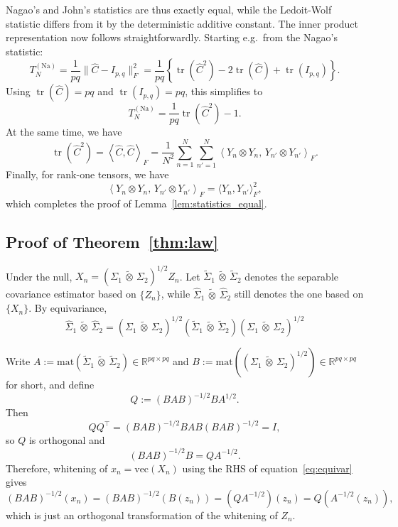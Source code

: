 \documentclass[12pt]{article}
\newcommand{\R}{\mathbb{R}}
\renewcommand{\vec}{\mathrm{vec}}
\newcommand{\mat}{\mathrm{mat}}
\newcommand{\ot}{\,\tilde\otimes\,}
\begin{document}
Nagao's and John's statistics are thus exactly equal, while the Ledoit-Wolf statistic differs from it by the deterministic additive constant. The inner product representation now follows straightforwardly. Starting e.g.~from the Nagao's statistic:
\[
T_N^{(\mathrm{Na})}
=
\frac{1}{pq}\|\widehat C-I_{p,q}\|_F^2
=
\frac{1}{pq}
\left\{
\operatorname{tr}(\widehat C^2)
-2\operatorname{tr}(\widehat C)
+\operatorname{tr}(I_{p,q})
\right\}.
\]
Using \(\operatorname{tr}(\widehat C)=pq\) and
\(\operatorname{tr}(I_{p,q})=pq\), this simplifies to
\[
T_N^{(\mathrm{Na})}
=
\frac{1}{pq}\operatorname{tr}(\widehat C^2)-1.
\]
At the same time, we have
\[
\operatorname{tr}(\widehat C^2)
=
\left\langle \widehat C,\widehat C \right\rangle_F
=
\frac{1}{N^2}
\sum_{n=1}^N
\sum_{n'=1}^N
\left\langle
Y_n\otimes Y_n,\,
Y_{n'}\otimes Y_{n'}
\right\rangle_F .
\]
Finally, for rank-one tensors, we have
\[
\left\langle
Y_n\otimes Y_n,\,
Y_{n'}\otimes Y_{n'}
\right\rangle_F
=
\langle Y_n,Y_{n'}\rangle_F^2,
\]
which completes the proof of Lemma~\ref{lem:statistics_equal}.

\subsection{Proof of Theorem~\ref{thm:law}}

Under the null, $X_n = (\Sigma_1\ot\Sigma_2)^{1/2} Z_n$. Let $\widetilde\Sigma_1\ot\widetilde\Sigma_2$ denotes the separable covariance estimator based on $\{Z_n\}$, while $\widehat\Sigma_1\ot\widehat\Sigma_2$ still denotes the one based on $\{X_n\}$. By equivariance,
\begin{equation}\label{eq:equivar}
    \widehat\Sigma_1\ot\widehat\Sigma_2 = (\Sigma_1\ot\Sigma_2)^{1/2} ( \widetilde\Sigma_1\ot\widetilde\Sigma_2)  (\Sigma_1\ot\Sigma_2)^{1/2} 
\end{equation}

Write $A:=\mat(\widetilde\Sigma_1\ot\widetilde\Sigma_2) \in \R^{pq \times pq}$ and $B := \mat((\Sigma_1\ot\Sigma_2)^{1/2})\in \R^{pq \times pq}$ for short, and define
\[
Q := (BAB)^{-1/2} B A^{1/2}. 
\]
Then
\[
Q Q^\top=(BAB)^{-1/2}BAB (BAB)^{-1/2}=I,
\]
so $Q$ is orthogonal and
\[
(BAB)^{-1/2}B=Q A^{-1/2}.
\]
Therefore, whitening of $x_n = \vec(X_n)$ using the RHS of equation~\eqref{eq:equivar} gives
\[
(B A B)^{-1/2}(x_n) = (B A B)^{-1/2}(B (z_n)) = (Q A^{-1/2})(z_n) = Q(A^{-1/2}(z_n)),
\]
which is just an orthogonal transformation of the whitening of $Z_n$.
\end{document}
